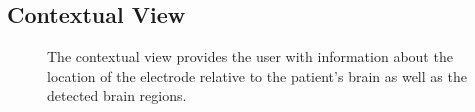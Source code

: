 \subsection{Contextual View} \label{contributions:dbs:contextual}
\begin{figure}
  \centering
  \caption{The contextual view provides the user with information about the location of the electrode relative to the patient's brain as well as the detected brain regions.}
  \label{contributions:dbs:contextual}
\end{figure}

